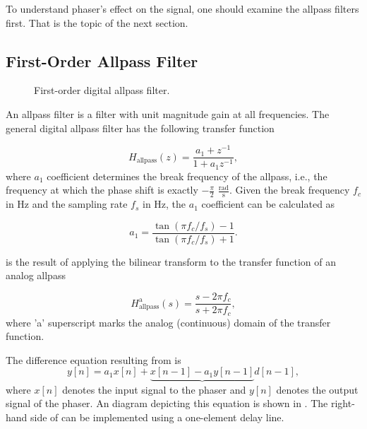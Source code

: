To understand phaser's effect on the signal, one should examine the allpass filters first. That is the topic of the next section.

\subsection{First-Order Allpass Filter}
\label{sec:first_order_allpass_filter}
\begin{figure}
    \centering
    \vspace{2mm}
    
    \caption{First-order digital allpass filter.}
    \label{fig:first_order_allpass_filter}
\end{figure}

An allpass filter is a filter with unit magnitude gain at all frequencies. The general digital allpass filter has the following transfer function \cite{Zoelzer2011,PASPWEB2010,Kiiski2016}

\begin{equation}
    H_\text{allpass}(z) = \frac{a_1 + z^{-1}}{1 + a_1 z^{-1}},
    \label{eq:allpass_transfer_function}
\end{equation}
where $a_1$ coefficient determines the break frequency of the allpass, i.e., the frequency at which the phase shift is exactly $-\frac{\pi}{2}$ $\frac{\text{rad}}{\text{s}}$. Given the break frequency $f_c$ in Hz and the sampling rate $f_s$ in Hz, the $a_1$ coefficient can be calculated as

\begin{equation}
    a_1 = \frac{\tan (\pi f_c / f_s) - 1}{\tan(\pi f_c / f_s) + 1}.
    \label{eq:allpass_coefficient}
\end{equation}

 is the result of applying the bilinear transform to the transfer function of an analog allpass

\begin{equation}
    H_{\text{allpass}}^{\text{a}} (s) = \frac{s - 2\pi f_c}{s + 2\pi f_c},
\end{equation}
where 'a' superscript marks the analog (continuous) domain of the transfer function.

The difference equation resulting from  is
\begin{equation}
    y[n] = a_1 x[n] + \underbrace{x[n-1] - a_1 y[n-1]}{d[n-1]},
    \label{eq:allpass_filter_difference_equation}
\end{equation}
where $x[n]$ denotes the input signal to the phaser and $y[n]$ denotes the output signal of the phaser. An diagram depicting this equation is shown in . The right-hand side of  can be implemented using a one-element delay line.

